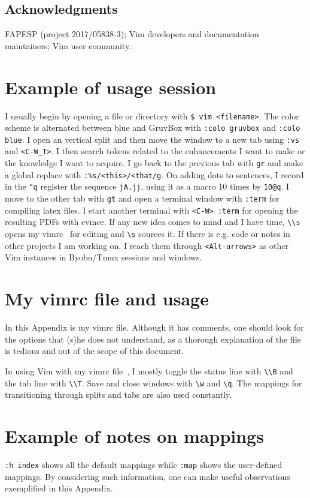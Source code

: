 \documentclass{article}
\newcommand{\ttt}[1] {
	\texttt{<#1>}}
\newcommand{\tttt}[1]{\texttt{#1}}
\begin{document}
\subsection*{Acknowledgments}
FAPESP (project 2017/05838-3); Vim developers and documentation maintainers;
Vim user community. 

\appendix
\section{Example of usage session}
I usually begin by opening a file or directory
with \tttt{\$ vim <filename>}.
The color scheme is alternated between
blue and GruvBox with
\tttt{:colo gruvbox} and \tttt{:colo blue}.
I open an vertical split and then move
the window to a new tab using
\tttt{:vs} and \ttt{C-W\_T}.
I then search tokens related to
the enhancements I want to make or
the knowledge I want to acquire.
I go back to the previous tab with \tttt{gr}
and make a global replace with
\tttt{:\%s/<this>/<that/g}.
On adding dots to sentences,
I record in the \tttt{"q} register
the sequence \tttt{jA.jj},
using it as a macro 10 times by
\tttt{10@q}.
I move to the other tab with \tttt{gt}
and open a terminal window with \tttt{:term}
for compiling latex files.
I start another terminal with \tttt{<C-W> :term}
for opening the resulting PDFs with evince.
If any new idea comes to mind and I have time,
\tttt{\textbackslash\textbackslash s} opens 
my vimrc~\cite{vimrc} for editing and \tttt{\textbackslash s}
sources it.
If there is e.g. code or notes in other projects I am working
on, I reach them through \tttt{<Alt-arrows>} as other Vim instances
in Byobu/Tmux sessions and windows.

\section{My vimrc file and usage}
In this Appendix is my vimrc file.
Although it has comments, one should
look for the options that (s)he does
not understand, as a thorough explanation
of the file is tedious and out of the scope
of this document.

In using Vim with my vimrc file~\cite{vimrc},
I mostly toggle the status line with \texttt{\textbackslash\textbackslash B}
and the tab line with \texttt{\textbackslash\textbackslash T}.
Save and close windows with \texttt{\textbackslash w} and \texttt{\textbackslash q}.
The mappings for transitioning through splits and tabs
are also used constantly.

\section{Example of notes on mappings}\label{notes}
\texttt{:h index} shows all the default mappings
while \tttt{:map} shows the user-defined mappings.
By considering such information, one can make
useful observations exemplified in this Appendix.
\end{document}
